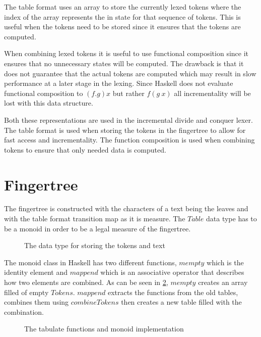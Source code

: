 The table format uses an array to store the currently lexed tokens where the
index of the array represents the in state for that sequence of tokens. This is
useful when the tokens need to be stored since it ensures that the tokens are
computed.

When combining lexed tokens it is useful to use functional composition since it
ensures that no unnecessary states will be computed. The drawback is that it
does not guarantee that the actual tokens are computed which may result in slow
performance at a later stage in the lexing. Since Haskell does not evaluate
functional composition to $(f . g) x$ but rather $f (g~x)$ all incrementality
will be lost with this data structure.

Both these representations are used in the incremental divide and conquer lexer.
The table format is used when storing the tokens in the fingertree to allow for
fast access and incrementality. The function composition is used when combining
tokens to ensure that only needed data is computed.

\section{Fingertree}
The fingertree is constructed with the characters of a text being the leaves and
with the table format transition map as it is measure. The $Table$ data type has
to be a monoid in order to be a legal measure of the fingertree.

\begin{figure}[h!]
  
  \caption{The data type for storing the tokens and text \label{fig:fingertreedt}}
\end{figure}

The monoid class in Haskell has two different functions, $mempty$ which is the
identity element and $mappend$ which is an associative operator that describes
how two elements are combined. As can be seen in \cref{fig:tablemonoid},
$mempty$ creates an array filled of empty $Tokens$. $mappend$ extracts the
functions from the old tables, combines them using $combineTokens$ then creates
a new table filled with the combination.

\begin{figure}[h!]
  
  \caption{The tabulate functions and monoid implementation \label{fig:tablemonoid}}
\end{figure}

